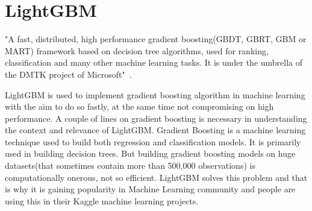 \section{LightGBM} 

"A fast, distributed, high performance gradient boosting(GBDT, GBRT, GBM or
MART) framework based on decision tree algorithms, used for ranking,
classification and many other machine learning tasks. It is under the umbrella
of the DMTK project of Microsoft"~\cite{hid- sp18-401-lightgbm}.

LightGBM is used to implement gradient boosting algorithm in machine learning
with the aim to do so fastly, at the same time not compromising on high
performance.  A couple of lines on gradient boosting is necessary in
understanding the context and relevance of LightGBM. Gradient Boosting is a
machine learning technique used to build both regression and classification
models. It is primarily used in building decision trees. But building gradient
boosting models on huge datasets(that sometimes contain more than 500,000
observations) is computationally onerous, not so efficient.  LightGBM solves
this problem and that is why it is gaining popularity in Machine Learning
community and people are using this in their Kaggle machine learning projects.
